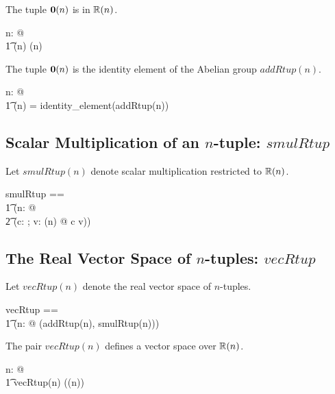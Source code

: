 \documentclass[11pt, oneside]{article}
\begin{document}
\begin{remark}
The tuple $\operatorname{\mathbf{0}}(n)$ is in $\operatorname{\mathbb{R}}(n)$.

\begin{zed}
\forall n: \nat @ \\
\t1	\zeroRtup(n) \in \Rtup(n)
\end{zed}

\end{remark}

\begin{remark}
The tuple $\operatorname{\mathbf{0}}(n)$ is the identity element of the Abelian group $addRtup(n)$.

\begin{zed}
\forall n: \nat @ \\
\t1	\zeroRtup(n) = identity\_element(addRtup(n))
\end{zed}

\end{remark}

\subsection{Scalar Multiplication of an $n$-tuple: $smulRtup$}

Let $smulRtup(n)$ denote scalar multiplication restricted to $\operatorname{\mathbb{R}}(n)$.

\begin{zed}
smulRtup == \\
\t1	(\lambda n: \nat @ \\
\t2		(\lambda c: \R; v: \Rtup(n) @ c \smulRinf v))
\end{zed}

\subsection{The Real Vector Space of $n$-tuples: $vecRtup$}

Let $vecRtup(n)$ denote the real vector space of $n$-tuples.

\begin{zed}
vecRtup == \\
\t1	(\lambda n: \nat @ (addRtup(n), smulRtup(n)))
\end{zed}

\begin{remark}
The pair $vecRtup(n)$ defines a vector space over $\operatorname{\mathbb{R}}(n)$.

\begin{zed}
\forall n: \nat @ \\
\t1	vecRtup(n) \in \vecR(\Rtup(n))
\end{zed}

\end{remark}
\end{document}
